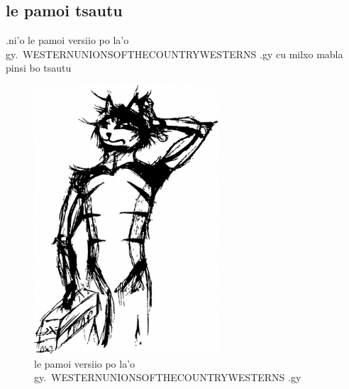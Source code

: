 \documentclass{report}
\newcommand\imageheight{10cm}
\begin{document}
\subsection{le pamoi tsautu}
.ni'o le pamoi versiio po la'o gy.\ WESTERNUNIONSOFTHECOUNTRYWESTERNS .gy cu milxo mabla pinsi bo tsautu
\begin{figure}[ht]
	\centering
	\includegraphics[height=\imageheight]{50x/toolbox/s1v1.jpg}
	\caption[center]{le pamoi versiio po la'o gy.\ WESTERNUNIONSOFTHECOUNTRYWESTERNS .gy}
\end{figure}
\end{document}
